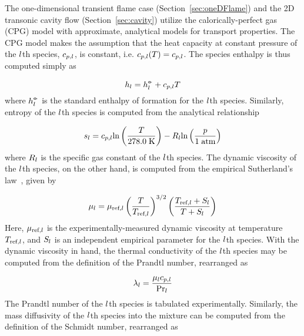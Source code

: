 The one-dimensional transient flame case (Section~\ref{sec:oneDFlame}) and the 2D transonic cavity flow (Section~\ref{sec:cavity}) utilize the calorically-perfect gas (CPG) model with approximate, analytical models for transport properties. The CPG model makes the assumption that the heat capacity at constant pressure of the $l$th species, $c_{p,l}$, is constant, i.e. $c_{p,l}(T) = c_{p,l}$. The species enthalpy is thus computed simply as

\begin{equation}\label{eq:cpgEnthSpec}
	h_{l} = h^{\circ\kern-0.47em-}_{l} + c_{p,l} T
\end{equation}
where $h^{\circ\kern-0.47em-}_{l}$ is the standard enthalpy of formation for the $l$th species. Similarly, entropy of the $l$th species is computed from the analytical relationship

\begin{equation}\label{eq:cpgEntropySpec}
	s_{l} = c_{p,l} \text{ln}\left(\frac{T}{278.0 \; \text{K}}\right) - R_{l} \text{ln}\left(\frac{p}{1 \; \text{atm}}\right)
\end{equation}
where $R_{l}$ is the specific gas constant of the $l$th species. The dynamic viscosity of the $l$th species, on the other hand, is computed from the empirical Sutherland's law~\cite{Sutherland1893}, given by

\begin{equation}\label{eq:viscSuthSpec}
	\mu_{l} = \mu_{\text{ref},l} \left( \frac{T}{T_{\text{ref},l}} \right)^{3/2} \left( \frac{T_{\text{ref},l} + S_{l}}{T + S_{l}} \right)
\end{equation}
Here, $\mu_{\text{ref},l}$ is the experimentally-measured dynamic viscosity at temperature $T_{\text{ref},l}$, and $S_{l}$ is an independent empirical parameter for the $l$th species. With the dynamic viscosity in hand, the thermal conductivity of the $l$th species may be computed from the definition of the Prandtl number, rearranged as

\begin{equation}\label{eq:cpgThermCondSpec}
	\lambda_{l} = \frac{\mu_{l} c_{p,l}}{\text{Pr}_{l}}
\end{equation}
The Prandtl number of the $l$th species is tabulated experimentally. Similarly, the mass diffusivity of the $l$th species into the mixture can be computed from the definition of the Schmidt number, rearranged as

